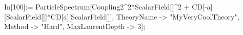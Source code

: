 In[100]:= ParticleSpectrum[Coupling2^2*ScalarField[]^2 + CD[-a][ScalarField[]]*CD[a][ScalarField[]], TheoryName -> "MyVeryCoolTheory", Method -> "Hard", MaxLaurentDepth -> 3]; 